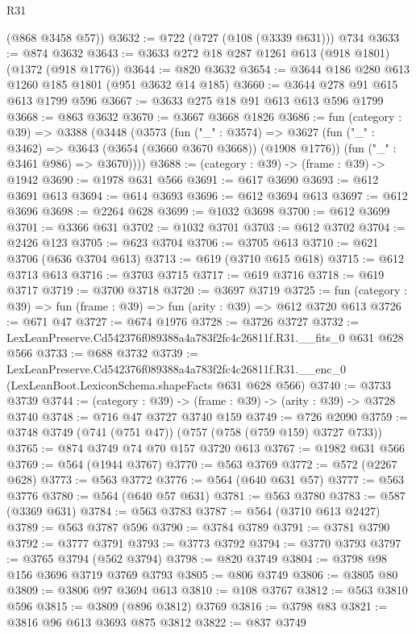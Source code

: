 \begin{lexlean}{R31}
\begin{coremodule}
      (@868 @3458 @57))
@3632 := @722 (@727 (@108 (@3339 @631))) @734
@3633 := @874 @3632
@3643 := @3633 @272 @18 @287 @1261 @613 (@918 @1801) (@1372 (@918 @1776))
@3644 := @820 @3632
@3654 := @3644 @186 @280 @613 @1260 @185 @1801 (@951 @3632 @14 @185)
@3660 := @3644 @278 @91 @615 @613 @1799 @596
@3667 := @3633 @275 @18 @91 @613 @613 @596 @1799
@3668 := @863 @3632
@3670 := @3667 @3668 @1826
@3686 := fun (category : @39) =>
  @3388
    (@3448
      (@3573
        (fun ("_" : @3574) =>
        @3627
          (fun ("_" : @3462) => @3643 (@3654 (@3660 @3670 @3668)) (@1908 @1776))
          (fun ("_" : @3461 @986) => @3670))))
@3688 := (category : @39) -> (frame : @39) -> @1942
@3690 := @1978 @631 @566
@3691 := @617 @3690
@3693 := @612 @3691 @613
@3694 := @614 @3693
@3696 := @612 @3694 @613
@3697 := @612 @3696
@3698 := @2264 @628
@3699 := @1032 @3698
@3700 := @612 @3699
@3701 := @3366 @631
@3702 := @1032 @3701
@3703 := @612 @3702
@3704 := @2426 @123
@3705 := @623 @3704
@3706 := @3705 @613
@3710 := @621 @3706 (@636 @3704 @613)
@3713 := @619 (@3710 @615 @618)
@3715 := @612 @3713 @613
@3716 := @3703 @3715
@3717 := @619 @3716
@3718 := @619 @3717
@3719 := @3700 @3718
@3720 := @3697 @3719
@3725 := fun (category : @39) => fun (frame : @39) => fun (arity : @39) => @612 @3720 @613
@3726 := @671 @47
@3727 := @674 @1976
@3728 := @3726 @3727
@3732 := LexLeanPreserve.Cd542376f089388a4a783f2fc4c26811f.R31.__fits_0 @631 @628 @566
@3733 := @688 @3732
@3739 := LexLeanPreserve.Cd542376f089388a4a783f2fc4c26811f.R31.__enc_0
    (LexLeanBoot.LexiconSchema.shapeFacts @631 @628 @566)
@3740 := @3733 @3739
@3744 := (category : @39) -> (frame : @39) -> (arity : @39) -> @3728 @3740
@3748 := @716 @47 @3727 @3740 @159
@3749 := @726 @2090
@3759 := @3748 @3749 (@741 (@751 @47)) (@757 (@758 (@759 @159) @3727 @733))
@3765 := @874 @3749 @74 @70 @157 @3720 @613
@3767 := @1982 @631 @566
@3769 := @564 (@1944 @3767)
@3770 := @563 @3769
@3772 := @572 (@2267 @628)
@3773 := @563 @3772
@3776 := @564 (@640 @631 @57)
@3777 := @563 @3776
@3780 := @564 (@640 @57 @631)
@3781 := @563 @3780
@3783 := @587 (@3369 @631)
@3784 := @563 @3783
@3787 := @564 (@3710 @613 @2427)
@3789 := @563 @3787 @596
@3790 := @3784 @3789
@3791 := @3781 @3790
@3792 := @3777 @3791
@3793 := @3773 @3792
@3794 := @3770 @3793
@3797 := @3765 @3794 (@562 @3794)
@3798 := @820 @3749
@3804 := @3798 @98 @156 @3696 @3719 @3769 @3793
@3805 := @806 @3749
@3806 := @3805 @80
@3809 := @3806 @97 @3694 @613
@3810 := @108 @3767
@3812 := @563 @3810 @596
@3815 := @3809 (@896 @3812) @3769
@3816 := @3798 @83
@3821 := @3816 @96 @613 @3693 @875 @3812
@3822 := @837 @3749

\end{coremodule}
\end{lexlean}
